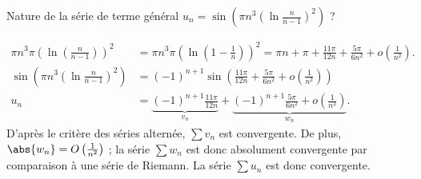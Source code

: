 \begin{enonce}
\begin{exercise}[ID={RMS121/2 E648,Mines-Pont PC},subtitle={},tags={}]
Nature de la série de terme général $u_n=\sin\left( \pi n^3\left( \ln\frac{n}{n-1} \right)^2  \right)$ ? 
\end{exercise}
\begin{solution}
\begin{align*}
    \pi n^3\pi \left(\ln\left( \frac{n}{n-1} \right) \right)^2 
&=\pi n^3\pi \left(\ln\left( 1-\frac1n \right) \right)^2 
  = \pi n+\pi +\frac{11\pi }{12 n}+\frac{5\pi }{6{n}^{2}}+o\left(\frac1{n^2}\right).\\
\sin\left( \pi n^3\left( \ln\frac{n}{n-1} \right)^2  \right)
  &= (-1)^{n+1}\sin\left( \frac{11\pi }{12 n}+\frac{5\pi }{6{n}^{2}} +o\left(\frac1{n^2}\right) \right) \\
  u_n&= \underbrace{(-1)^{n+1}\frac{11\pi}{12 n}}_{v_n} + \underbrace{(-1)^{n+1}\frac{5\pi}{6n^2} + o\left(\frac1{n^2}\right)}_{w_n}.
\end{align*}
  D'après le critère des séries alternée, $\sum v_n$ est convergente. De plus, $\abs{w_n}=O\left(\frac1{n^2}\right)$ ; la série $\sum w_n$ est donc absolument convergente par comparaison à une série de Riemann. La série $\sum u_n$ est donc convergente.
\end{solution}
\end{enonce}

